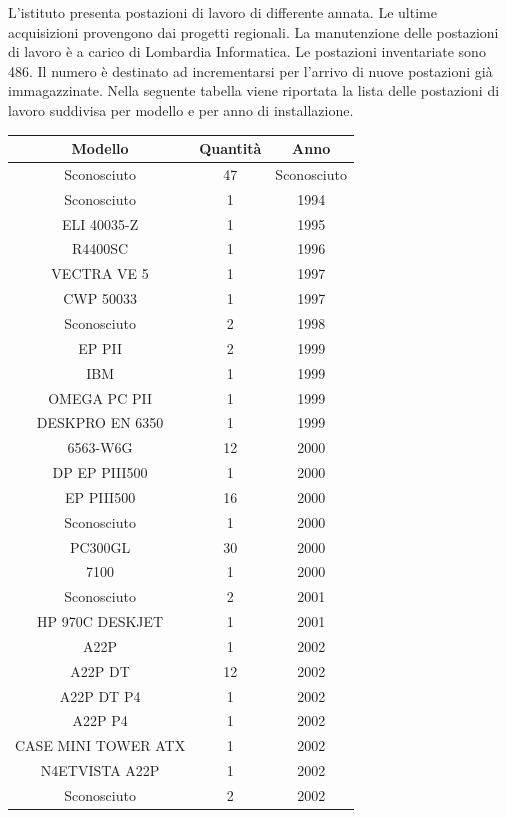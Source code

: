 \documentclass[12pt, a4paper, titlepage]{report}
\begin{document}
		L'istituto presenta postazioni di lavoro di differente annata. Le ultime acquisizioni provengono dai progetti regionali. La manutenzione delle postazioni di lavoro è a carico di Lombardia Informatica.
		Le postazioni inventariate sono 486. Il numero è destinato ad incrementarsi per l'arrivo di nuove postazioni già immagazzinate. Nella seguente tabella viene riportata la lista delle postazioni di lavoro suddivisa per modello e per anno di installazione.
		
		\begin{longtable}{| c | c | c |}
		\hline
		\textbf{Modello} & \textbf{Quantità} & \textbf{Anno}\\ \hline
		Sconosciuto & 47 & Sconosciuto \\ \hline
		Sconosciuto & 1 & 1994 \\ \hline
		ELI 40035-Z & 1 & 1995 \\ \hline
		R4400SC & 1 & 1996 \\ \hline
		VECTRA VE 5 & 1 & 1997 \\ \hline
		CWP 50033 & 1 & 1997 \\ \hline
		Sconosciuto & 2 & 1998 \\ \hline
		EP PII & 2 & 1999 \\ \hline
		IBM & 1 & 1999 \\ \hline
		OMEGA PC PII & 1 & 1999 \\ \hline
		DESKPRO EN 6350 & 1 & 1999 \\ \hline
		6563-W6G & 12 & 2000 \\ \hline
		DP EP PIII500 & 1 & 2000 \\ \hline
		EP PIII500 & 16 & 2000 \\ \hline
		Sconosciuto & 1 & 2000 \\ \hline
		PC300GL & 30 & 2000 \\ \hline
		7100 & 1 & 2000 \\ \hline
		Sconosciuto & 2 & 2001 \\ \hline
		HP 970C DESKJET & 1 & 2001 \\ \hline
		A22P & 1 & 2002 \\ \hline
		A22P DT & 12 & 2002 \\ \hline
		A22P DT P4 & 1 & 2002 \\ \hline
		A22P P4 & 1 & 2002 \\ \hline
		CASE MINI TOWER ATX & 1 & 2002 \\ \hline
		N4ETVISTA A22P & 1 & 2002 \\ \hline
		Sconosciuto & 2 & 2002 \\ \hline

\end{longtable}
\end{document}
